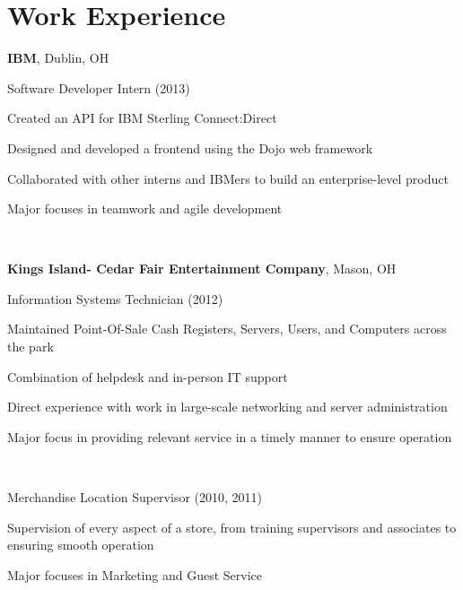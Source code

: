 \documentclass[letterpaper]{resume}
\begin{document}
\section{Work Experience}
\textbf{IBM}, Dublin, OH

Software Developer Intern (2013)
\begin{compactitem}
	\item Created an API for IBM Sterling Connect:Direct

	\item Designed and developed a frontend using the Dojo web framework

	\item Collaborated with other interns and IBMers to build an enterprise-level product

	\item Major focuses in teamwork and agile development
\end{compactitem}

~

%
%

\textbf{Kings Island- Cedar Fair Entertainment Company}, Mason, OH

Information Systems Technician (2012)
\begin{compactitem}
	\item Maintained Point-Of-Sale Cash Registers, Servers, Users, and Computers across the park

	\item Combination of helpdesk and in-person IT support

	\item Direct experience with work in large-scale networking and server administration

	\item Major focus in providing relevant service in a timely manner to ensure operation
\end{compactitem}

~

Merchandise Location Supervisor (2010, 2011)

\begin{compactitem}
	\item Supervision of every aspect of a store, from training supervisors and associates to ensuring smooth operation

	\item Major focuses in Marketing and Guest Service
\end{compactitem}
\end{document}

